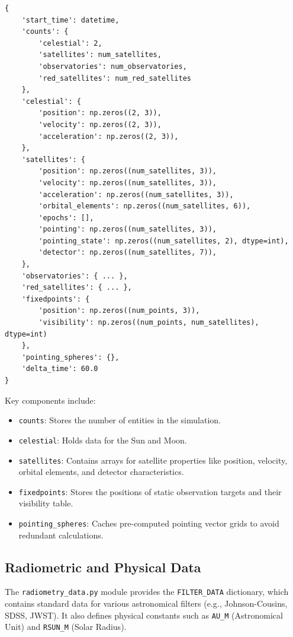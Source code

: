 \documentclass[11pt]{article}
\begin{document}
\begin{verbatim}
{
    'start_time': datetime,
    'counts': {
        'celestial': 2,
        'satellites': num_satellites,
        'observatories': num_observatories,
        'red_satellites': num_red_satellites
    },
    'celestial': {
        'position': np.zeros((2, 3)),
        'velocity': np.zeros((2, 3)),
        'acceleration': np.zeros((2, 3)),
    },
    'satellites': {
        'position': np.zeros((num_satellites, 3)),
        'velocity': np.zeros((num_satellites, 3)),
        'acceleration': np.zeros((num_satellites, 3)),
        'orbital_elements': np.zeros((num_satellites, 6)),
        'epochs': [],
        'pointing': np.zeros((num_satellites, 3)),
        'pointing_state': np.zeros((num_satellites, 2), dtype=int),
        'detector': np.zeros((num_satellites, 7)),
    },
    'observatories': { ... },
    'red_satellites': { ... },
    'fixedpoints': {
        'position': np.zeros((num_points, 3)),
        'visibility': np.zeros((num_points, num_satellites), dtype=int)
    },
    'pointing_spheres': {},
    'delta_time': 60.0
}
\end{verbatim}

Key components include:
\begin{itemize}
    \item \texttt{counts}: Stores the number of entities in the simulation.
    \item \texttt{celestial}: Holds data for the Sun and Moon.
    \item \texttt{satellites}: Contains arrays for satellite properties like position, velocity, orbital elements, and detector characteristics.
    \item \texttt{fixedpoints}: Stores the positions of static observation targets and their visibility table.
    \item \texttt{pointing\_spheres}: Caches pre-computed pointing vector grids to avoid redundant calculations.
\end{itemize}

\subsection{Radiometric and Physical Data}
The \texttt{radiometry\_data.py} module provides the \texttt{FILTER\_DATA} dictionary, which contains standard data for various astronomical filters (e.g., Johnson-Cousins, SDSS, JWST). It also defines physical constants such as \texttt{AU\_M} (Astronomical Unit) and \texttt{RSUN\_M} (Solar Radius).
\end{document}
